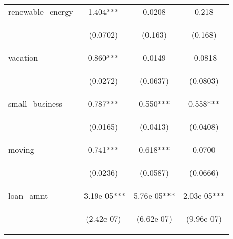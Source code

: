 \begin{center}
\begin{tabular}{lccc}
renewable\_energy & 1.404*** & 0.0208 & 0.218 \\
\vspace{4pt} & \begin{footnotesize}(0.0702)\end{footnotesize} & \begin{footnotesize}(0.163)\end{footnotesize} & \begin{footnotesize}(0.168)\end{footnotesize} \\
vacation & 0.860*** & 0.0149 & -0.0818 \\
\vspace{4pt} & \begin{footnotesize}(0.0272)\end{footnotesize} & \begin{footnotesize}(0.0637)\end{footnotesize} & \begin{footnotesize}(0.0803)\end{footnotesize} \\
small\_business & 0.787*** & 0.550*** & 0.558*** \\
\vspace{4pt} & \begin{footnotesize}(0.0165)\end{footnotesize} & \begin{footnotesize}(0.0413)\end{footnotesize} & \begin{footnotesize}(0.0408)\end{footnotesize} \\
moving & 0.741*** & 0.618*** & 0.0700 \\
\vspace{4pt} & \begin{footnotesize}(0.0236)\end{footnotesize} & \begin{footnotesize}(0.0587)\end{footnotesize} & \begin{footnotesize}(0.0666)\end{footnotesize} \\
loan\_amnt & -3.19e-05*** & 5.76e-05*** & 2.03e-05*** \\
\vspace{4pt} & \begin{footnotesize}(2.42e-07)\end{footnotesize} & \begin{footnotesize}(6.62e-07)\end{footnotesize} & \begin{footnotesize}(9.96e-07)\end{footnotesize} \\

\end{tabular}
\end{center}
